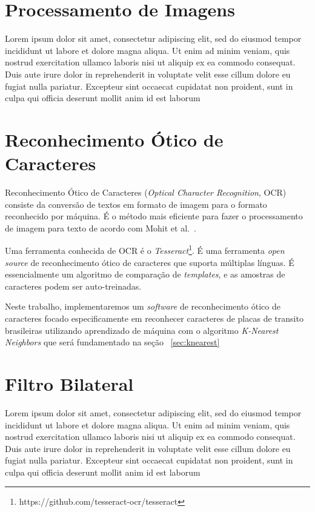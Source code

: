 \section{Processamento de Imagens}
\label{sec:processamentoimagens}

Lorem ipsum dolor sit amet, consectetur adipiscing elit, sed do eiusmod tempor incididunt ut labore et dolore magna aliqua. Ut enim ad minim veniam, quis nostrud exercitation ullamco laboris nisi ut aliquip ex ea commodo consequat. Duis aute irure dolor in reprehenderit in voluptate velit esse cillum dolore eu fugiat nulla pariatur. Excepteur sint occaecat cupidatat non proident, sunt in culpa qui officia deserunt mollit anim id est laborum

\section{Reconhecimento Ótico de Caracteres}
\label{sec:ocr}

Reconhecimento Ótico de Caracteres (\emph{Optical Character Recognition}, OCR)
consiste da conversão de textos em formato de imagem para o formato reconhecido
por máquina. É o método mais eficiente para fazer o processamento de imagem para
texto de acordo com Mohit et al.~\cite{mohit2015designing}.

Uma ferramenta conhecida de OCR é o
\emph{Tesseract}\footnote{https://github.com/tesseract-ocr/tesseract}. É uma ferramenta
\emph{open source} de reconhecimento ótico de caracteres que suporta múltiplas
línguas.  É essencialmente um algoritmo de comparação de \emph{templates}, e as
amostras de caracteres podem ser auto-treinadas.~\cite{ho2016intelligent}

Neste trabalho, implementaremos um \emph{software} de reconhecimento ótico de caracteres focado especificamente em reconhecer caracteres de placas de transito brasileiras utilizando aprendizado de máquina com o algoritmo \emph{K-Nearest Neighbors} que será fundamentado na seção ~\ref{sec:knearest}

\section{Filtro Bilateral}
\label{sec:bilateralfilter}

Lorem ipsum dolor sit amet, consectetur adipiscing elit, sed do eiusmod tempor incididunt ut labore et dolore magna aliqua. Ut enim ad minim veniam, quis nostrud exercitation ullamco laboris nisi ut aliquip ex ea commodo consequat. Duis aute irure dolor in reprehenderit in voluptate velit esse cillum dolore eu fugiat nulla pariatur. Excepteur sint occaecat cupidatat non proident, sunt in culpa qui officia deserunt mollit anim id est laborum


